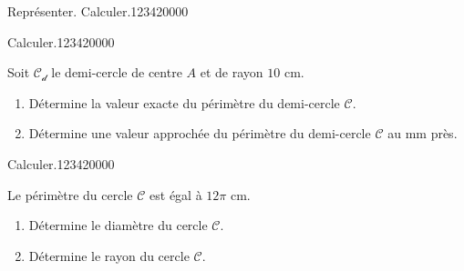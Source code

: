 \begin{pageAD}
\begin{ExoCad}{Représenter. Calculer.}{1234}{2}{0}{0}{0}{0}
\end{ExoCad} 
  
\begin{ExoCad}{Calculer.}{1234}{2}{0}{0}{0}{0}

Soit $\mathcal{C_d}$ le demi-cercle de centre $A$ et de rayon $10$ cm.
\begin{enumerate}
\item Détermine la valeur exacte du périmètre du demi-cercle $\mathcal{C}$. 
\item Détermine une valeur approchée du périmètre du demi-cercle $\mathcal{C}$ au mm près. 
 \end{enumerate}  

 
\end{ExoCad} 
  
\begin{ExoCad}{Calculer.}{1234}{2}{0}{0}{0}{0}

Le périmètre du cercle $\mathcal{C}$ est égal à $12\pi$ cm.
 \begin{enumerate}
\item Détermine le diamètre du cercle $\mathcal{C}$. 
\item Détermine le rayon du cercle $\mathcal{C}$.
 \end{enumerate}  

 \end{ExoCad} 
  
 
\end{pageAD}
  
